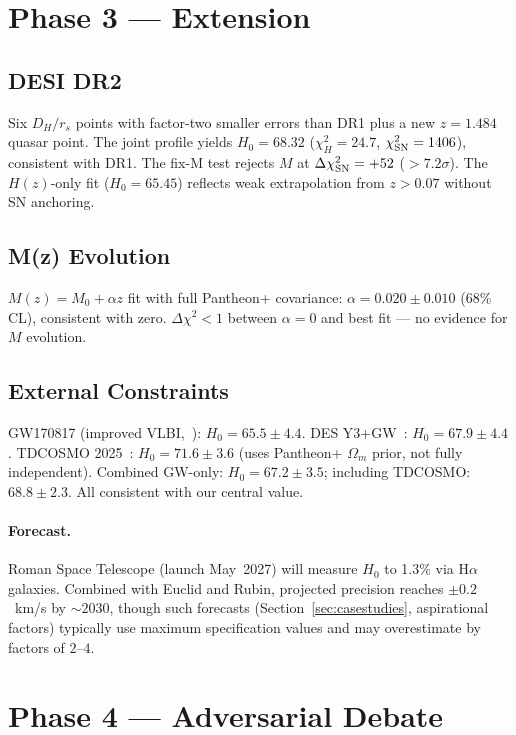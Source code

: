 \documentclass[twocolumn]{aastex631}
\begin{document}
\section{Phase 3 --- Extension}
\label{sec:extension}

\subsection{DESI DR2}
Six $D_H/r_s$ points with factor-two smaller errors than DR1 plus a
new $z=1.484$ quasar point.  The joint profile yields $H_0=68.32$
($\chi^2_H=24.7$, $\chi^2_{\rm SN}=1406$), consistent with DR1.
The fix-M test rejects $M$ at $\Delta\chi^2_{\rm SN}=+52$
($>7.2\sigma$).  The $H(z)$-only fit ($H_0=65.45$) reflects weak
extrapolation from $z>0.07$ without SN anchoring.

\subsection{M(z) Evolution}
$M(z)=M_0+\alpha z$ fit with full Pantheon+ covariance:
$\alpha=0.020\pm0.010$ (68\% CL), consistent with zero.
$\Delta\chi^2<1$ between $\alpha=0$ and best fit --- no evidence for
$M$ evolution.

\subsection{External Constraints}
GW170817 (improved VLBI,~\cite{gw170817_2026}): $H_0=65.5\pm4.4$.
DES Y3+GW~\cite{des_gw_2026}: $H_0=67.9\pm4.4$.
TDCOSMO 2025~\cite{tdcosmo2025}: $H_0=71.6\pm3.6$ (uses Pantheon+
$\Omega_m$ prior, not fully independent).
Combined GW-only: $H_0=67.2\pm3.5$; including TDCOSMO: $68.8\pm2.3$.
All consistent with our central value.

\paragraph{Forecast.}
Roman Space Telescope (launch May~2027) will measure $H_0$ to 1.3\%
via H$\alpha$ galaxies.  Combined with Euclid and Rubin, projected
precision reaches $\pm0.2$~km/s by $\sim2030$, though such forecasts
(Section~\ref{sec:casestudies}, aspirational factors) typically use
maximum specification values and may overestimate by factors of
$2$--$4$.

\section{Phase 4 --- Adversarial Debate}
\label{sec:debate}
\end{document}
